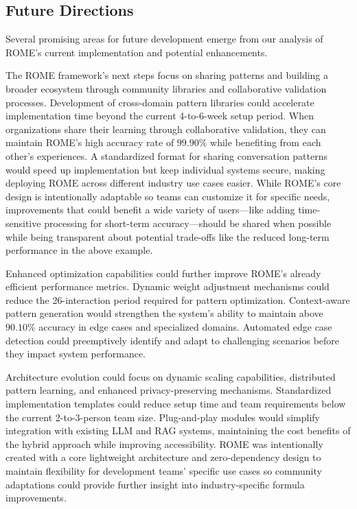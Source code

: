 \documentclass[12pt]{article}
\begin{document}
\subsection{Future Directions}
Several promising areas for future development emerge from our analysis of ROME's current implementation and potential enhancements.

The ROME framework's next steps focus on sharing patterns and building a broader ecosystem through community libraries and collaborative validation processes. Development of cross-domain pattern libraries could accelerate implementation time beyond the current 4-to-6-week setup period. When organizations share their learning through collaborative validation, they can maintain ROME's high accuracy rate of $99.90\%$ while benefiting from each other's experiences. A standardized format for sharing conversation patterns would speed up implementation but keep individual systems secure, making deploying ROME across different industry use cases easier. While ROME's core design is intentionally adaptable so teams can customize it for specific needs, improvements that could benefit a wide variety of users---like adding time-sensitive processing for short-term accuracy---should be shared when possible while being transparent about potential trade-offs like the reduced long-term performance in the above example.

Enhanced optimization capabilities could further improve ROME's already efficient performance metrics. Dynamic weight adjustment mechanisms could reduce the 26-interaction period required for pattern optimization. Context-aware pattern generation would strengthen the system's ability to maintain above $90.10\%$ accuracy in edge cases and specialized domains. Automated edge case detection could preemptively identify and adapt to challenging scenarios before they impact system performance.

Architecture evolution could focus on dynamic scaling capabilities, distributed pattern learning, and enhanced privacy-preserving mechanisms. Standardized implementation templates could reduce setup time and team requirements below the current 2-to-3-person team size. Plug-and-play modules would simplify integration with existing LLM and RAG systems, maintaining the cost benefits of the hybrid approach while improving accessibility. ROME was intentionally created with a core lightweight architecture and zero-dependency design to maintain flexibility for development teams' specific use cases so community adaptations could provide further insight into industry-specific formula improvements.
\end{document}
